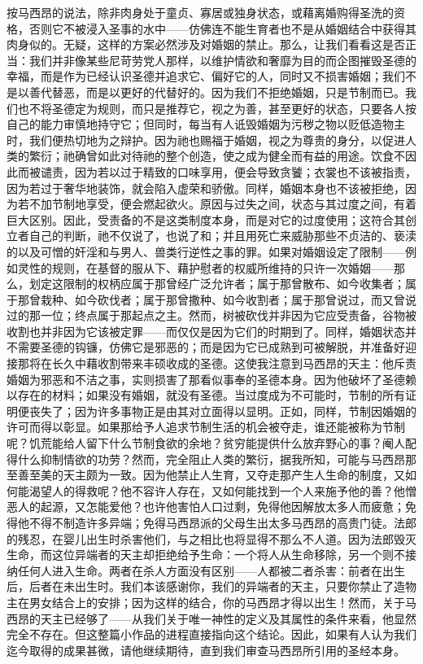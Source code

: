 按马西昂的说法，除非肉身处于童贞、寡居或独身状态，或藉离婚购得圣洗的资格，否则它不被浸入圣事的水中——仿佛连不能生育者也不是从婚姻结合中获得其肉身似的。无疑，这样的方案必然涉及对婚姻的禁止。那么，让我们看看这是否正当：我们并非像某些尼苛劳党人那样，以维护情欲和奢靡为目的而企图摧毁圣德的幸福，而是作为已经认识圣德并追求它、偏好它的人，同时又不损害婚姻；我们不是以善代替恶，而是以更好的代替好的。因为我们不拒绝婚姻，只是节制而已。我们也不将圣德定为规则，而只是推荐它，视之为善，甚至更好的状态，只要各人按自己的能力审慎地持守它；但同时，每当有人诋毁婚姻为污秽之物以贬低造物主时，我们便热切地为之辩护。因为祂也赐福于婚姻，视之为尊贵的身分，以促进人类的繁衍；祂确曾如此对待祂的整个创造，使之成为健全而有益的用途。饮食不因此而被谴责，因为若以过于精致的口味享用，便会导致贪饕；衣裳也不该被指责，因为若过于奢华地装饰，就会陷入虚荣和骄傲。同样，婚姻本身也不该被拒绝，因为若不加节制地享受，便会燃起欲火。原因与过失之间，状态与其过度之间，有着巨大区别。因此，受责备的不是这类制度本身，而是对它的过度使用；这符合其创立者自己的判断，祂不仅说了，也说了和；并且用死亡来威胁那些不贞洁的、亵渎的以及可憎的奸淫和与男人、兽类行逆性之事的罪。如果对婚姻设定了限制——例如灵性的规则，在基督的服从下、藉护慰者的权威所维持的只许一次婚姻——那么，划定这限制的权柄应属于那曾经广泛允许者；属于那曾散布、如今收集者；属于那曾栽种、如今砍伐者；属于那曾撒种、如今收割者；属于那曾说过，而又曾说过的那一位；终点属于那起点之主。然而，树被砍伐并非因为它应受责备，谷物被收割也并非因为它该被定罪——而仅仅是因为它们的时期到了。同样，婚姻状态并不需要圣德的钩镰，仿佛它是邪恶的；而是因为它已成熟到可被解脱，并准备好迎接那将在长久中藉收割带来丰硕收成的圣德。这使我注意到马西昂的天主：他斥责婚姻为邪恶和不洁之事，实则损害了那看似事奉的圣德本身。因为他破坏了圣德赖以存在的材料；如果没有婚姻，就没有圣德。当过度成为不可能时，节制的所有证明便丧失了；因为许多事物正是由其对立面得以显明。正如，同样，节制因婚姻的许可而得以彰显。如果那给予人追求节制生活的机会被夺走，谁还能被称为节制呢？饥荒能给人留下什么节制食欲的余地？贫穷能提供什么放弃野心的事？阉人配得什么抑制情欲的功劳？然而，完全阻止人类的繁衍，据我所知，可能与马西昂那至善至美的天主颇为一致。因为他禁止人生育，又夺走那产生人生命的制度，又如何能渴望人的得救呢？他不容许人存在，又如何能找到一个人来施予他的善？他憎恶人的起源，又怎能爱他？也许他害怕人口过剩，免得他因解放太多人而疲惫；免得他不得不制造许多异端；免得马西昂派的父母生出太多马西昂的高贵门徒。法郎的残忍，在婴儿出生时杀害他们，与之相比也将显得不那么不人道。因为法郎毁灭生命，而这位异端者的天主却拒绝给予生命：一个将人从生命移除，另一个则不接纳任何人进入生命。两者在杀人方面没有区别——人都被二者杀害：前者在出生后，后者在未出生时。我们本该感谢你，我们的异端者的天主，只要你禁止了造物主在男女结合上的安排；因为这样的结合，你的马西昂才得以出生！然而，关于马西昂的天主已经够了——从我们关于唯一神性的定义及其属性的条件来看，他显然完全不存在。但这整篇小作品的进程直接指向这个结论。因此，如果有人认为我们迄今取得的成果甚微，请他继续期待，直到我们审查马西昂所引用的圣经本身。\par

